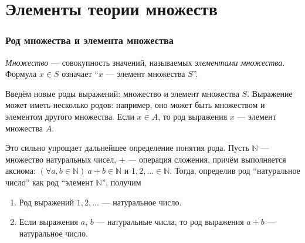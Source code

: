 \part{Элементы теории множеств}

\section{Род множества и элемента множества}

 {\it Множество} --- совокупность значений, называемых {\it элементами множества}.
Формула $x\in S$ означает ``$x$ --- элемент множества $S$''.

Введём новые роды выражений: множество и элемент множества $S$.
Выражение может иметь несколько родов: например, оно может быть множеством
и элементом другого множества.
Если $x\in A$, то род выражения $x$ --- элемент множества $A$.

\newcommand\N{\mathbb N}
Это сильно упрощает дальнейшее определение понятия рода. Пусть $\N$ --- множество
натуральных чисел, $+$ --- операция сложения, причём выполняется
аксиома: $(\forall a,b\in\N)~a+b\in\N$
и $1,2,...\in\N$. Тогда, определив род ``натуральное число'' как род ``элемент $\N$'',
получим
\begin{enumerate}
	\item{}Род выражений $1,2,...$ --- натуральное число.
	\item{}Если выражения $a$, $b$ --- натуральные числа,
	то род выражения $a+b$ --- натуральное число.
\end{enumerate}

